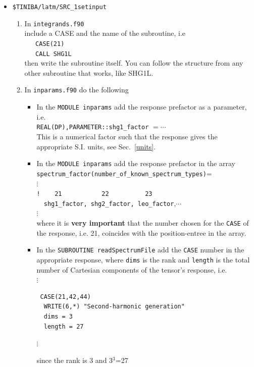 \documentclass[12pt]{article}
\numberwithin{equation}{section}
\begin{document}
\begin{itemize}
\item\verb=$TINIBA/latm/SRC_1setinput=

\begin{enumerate}
\item In
  \verb=integrands.f90=\\
 include a CASE and the name of the subroutine, i.e \\
\verb=   CASE(21)=\\
\verb=   CALL SHG1L=\\
then write the subroutine itself. You can follow the structure from
  any other subroutine that works, like SHG1L. 

\item In \verb=inparams.f90= do the following
\begin{itemize}
\item In the \verb=MODULE inparams= 
add the response prefactor as a parameter, i.e.\\
\verb=REAL(DP),PARAMETER::shg1_factor= $=\cdots$\\
This is a numerical factor such that the response gives the
appropriate S.I. units, see Sec.~\ref{units}.  

\item In the \verb=MODULE inparams=  add the response prefactor in the array\\
\verb=spectrum_factor(number_of_known_spectrum_types)==\\       
$\vdots$\\
\verb=!    21           22          23           =\\
\verb=  shg1_factor, shg2_factor, leo_factor=,$\cdots$\\
$\vdots$\\
where it is {\bf very important} that the number chosen for the
\verb=CASE= of the response, i.e. 21, coincides with the position-entree in
the array.
\item In the \verb=SUBROUTINE readSpectrumFile= add the \verb=CASE=
 number in the appropriate response, where \verb=dims= is the rank
 and \verb=length= is the total number of
 Cartesian components of
the tensor's response, i.e.\\
$\vdots$
\begin{verbatim}
 CASE(21,42,44)
  WRITE(6,*) "Second-harmonic generation"
  dims = 3
  length = 27
\end{verbatim}
$\vdots$

since the rank is 3 and 3$^3$=27


\end{itemize}
\end{enumerate}
\end{itemize}
\end{document}
